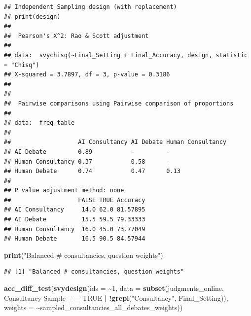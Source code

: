 \documentclass[
]{article}
\newenvironment{Shaded}{\begin{snugshade}}{\end{snugshade}}
\newcommand{\AttributeTok}[1]{\textcolor[rgb]{0.13,0.29,0.53}{#1}}
\newcommand{\ConstantTok}[1]{\textcolor[rgb]{0.56,0.35,0.01}{#1}}
\newcommand{\DecValTok}[1]{\textcolor[rgb]{0.00,0.00,0.81}{#1}}
\newcommand{\FunctionTok}[1]{\textcolor[rgb]{0.13,0.29,0.53}{\textbf{#1}}}
\newcommand{\NormalTok}[1]{#1}
\newcommand{\SpecialCharTok}[1]{\textcolor[rgb]{0.81,0.36,0.00}{\textbf{#1}}}
\newcommand{\StringTok}[1]{\textcolor[rgb]{0.31,0.60,0.02}{#1}}
\begin{document}
\begin{verbatim}
## Independent Sampling design (with replacement)
## print(design)
## 
##  Pearson's X^2: Rao & Scott adjustment
## 
## data:  svychisq(~Final_Setting + Final_Accuracy, design, statistic = "Chisq")
## X-squared = 3.7897, df = 3, p-value = 0.3186
## 
## 
##  Pairwise comparisons using Pairwise comparison of proportions 
## 
## data:  freq_table 
## 
##                   AI Consultancy AI Debate Human Consultancy
## AI Debate         0.89           -         -                
## Human Consultancy 0.37           0.58      -                
## Human Debate      0.74           0.47      0.13             
## 
## P value adjustment method: none 
##                   FALSE TRUE Accuracy
## AI Consultancy     14.0 62.0 81.57895
## AI Debate          15.5 59.5 79.33333
## Human Consultancy  16.0 45.0 73.77049
## Human Debate       16.5 90.5 84.57944
\end{verbatim}

\begin{Shaded}
\begin{Highlighting}[]
\FunctionTok{print}\NormalTok{(}\StringTok{"Balanced \# consultancies, question weights"}\NormalTok{)}
\end{Highlighting}
\end{Shaded}

\begin{verbatim}
## [1] "Balanced # consultancies, question weights"
\end{verbatim}

\begin{Shaded}
\begin{Highlighting}[]
\FunctionTok{acc\_diff\_test}\NormalTok{(}\FunctionTok{svydesign}\NormalTok{(}\AttributeTok{ids =} \SpecialCharTok{\textasciitilde{}}\DecValTok{1}\NormalTok{, }\AttributeTok{data =} \FunctionTok{subset}\NormalTok{(judgments\_online, }\StringTok{\textasciigrave{}}\AttributeTok{Consultancy Sample}\StringTok{\textasciigrave{}} \SpecialCharTok{==} \ConstantTok{TRUE} \SpecialCharTok{|} \SpecialCharTok{!}\FunctionTok{grepl}\NormalTok{(}\StringTok{"Consultancy"}\NormalTok{, Final\_Setting)), }\AttributeTok{weights =} \SpecialCharTok{\textasciitilde{}}\NormalTok{sampled\_consultancies\_all\_debates\_weights))}
\end{Highlighting}
\end{Shaded}
\end{document}
